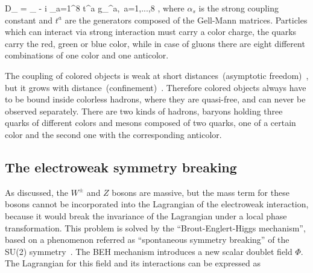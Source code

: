 {
   D_{\mu} = \partial_{\mu} - i \sum_{a=1}^{8} t^{a} g_{\mu}^{a},~a=1,...,8 , 
}
where $\alpha_{s}$ is the strong coupling constant and $t^{a}$ are the generators composed of the Gell-Mann matrices. Particles which can interact via strong interaction must carry a color charge, the quarks carry the red, green or blue color, while in case of gluons there are eight different combinations of one color and one anticolor.

The coupling of colored objects is weak at short distances~(asymptotic freedom)~\cite{Gross:1973id}, but it grows with distance~(confinement)~\cite{Wilson:1974sk}. Therefore colored objects always have to be bound inside colorless hadrons, where they are quasi-free, and can never be observed separately. There are two kinds of hadrons, baryons holding three quarks of different colors and mesons composed of two quarks, one of a certain color and the second one with the corresponding anticolor.





\subsection{The electroweak symmetry breaking~\label{sec:EWbreaking}}

As discussed, the $W^{\pm}$ and $Z$ bosons are massive, but the mass term for these bosons cannot be incorporated into the Lagrangian of the electroweak interaction, because it would break the invariance of the Lagrangian under a local phase transformation. This problem is solved by the ``Brout-Englert-Higgs mechanism'', based on a phenomenon referred as ``spontaneous symmetry breaking'' of the SU(2) symmetry~\cite{Englert:1964et, Guralnik:1964eu}. The BEH mechanism introduces a new scalar doublet field $\Phi$. The Lagrangian for this field and its interactions can be expressed as 

